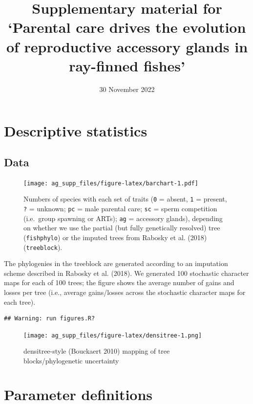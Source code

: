 \documentclass[
]{article}
\title{Supplementary material for `Parental care drives the evolution of
reproductive accessory glands in ray-finned fishes'}
\author{}
\date{\vspace{-2.5em}30 November 2022}
\begin{document}
\maketitle

{
\setcounter{tocdepth}{2}
\tableofcontents
}
\hypertarget{descriptive-statistics}{%
\section{Descriptive statistics}\label{descriptive-statistics}}

\hypertarget{data}{%
\subsection{Data}\label{data}}

\begin{figure}
\centering
\texttt{[image: ag\_supp\_files/figure-latex/barchart-1.pdf]}
\caption{Numbers of species with each set of traits (\texttt{0} =
absent, \texttt{1} = present, \texttt{?} = unknown; \texttt{pc} = male
parental care; \texttt{sc} = sperm competition (i.e.~group spawning or
ARTs); \texttt{ag} = accessory glands), depending on whether we use the
partial (but fully genetically resolved) tree (\texttt{fishphylo}) or
the imputed trees from Rabosky et al. (2018) (\texttt{treeblock}).}
\end{figure}

The phylogenies in the treeblock are generated according to an
imputation scheme described in Rabosky et al. (2018). We generated 100
stochastic character maps for each of 100 trees; the figure shows the
average number of gains and losses per tree (i.e., average gains/losses
across the stochastic character maps for each tree).

\begin{verbatim}
## Warning: run figures.R?
\end{verbatim}

\begin{figure}
\centering
\texttt{[image: ag\_supp\_files/figure-latex/densitree-1.png]}
\caption{densitree-style (Bouckaert 2010) mapping of tree
blocks/phylogenetic uncertainty}
\end{figure}

\hypertarget{parameter-definitions}{%
\section{Parameter definitions}\label{parameter-definitions}}
\end{document}
